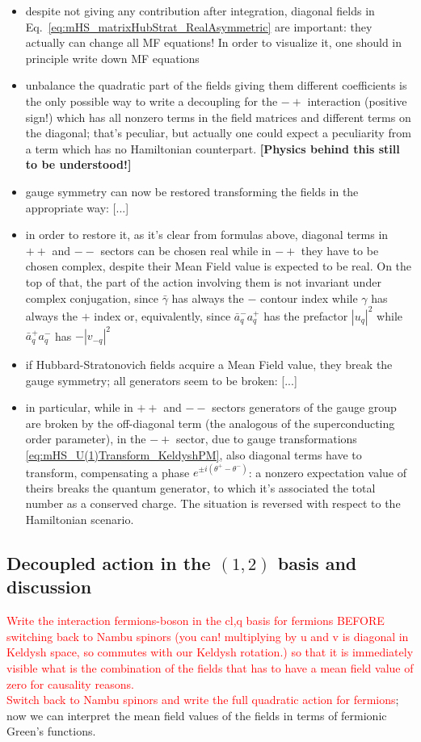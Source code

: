 \documentclass[a4paper,11pt, english]{article}
\newcommand{\ssubsection}[2]{\subsection{\texorpdfstring{#1}{#2}}}
\theoremstyle{remark}
\newcommand{\nsec}{\vskip 0.8cm}
\newcommand{\gammabar}{\bar{\gamma}}
\begin{document}
\begin{itemize}
 \item despite not giving any contribution after integration, diagonal fields in Eq.~\eqref{eq:mHS_matrixHubStrat_RealAsymmetric} are important: they actually can change all MF equations! In order to visualize it, one should in principle write down MF equations
 \item unbalance the quadratic part of the fields giving them different coefficients is the only possible way to write a decoupling for the $-+$ interaction (positive sign!) which has all nonzero terms in the field matrices and different terms on the diagonal; that's peculiar, but actually one could expect a peculiarity from a term which has no Hamiltonian counterpart. \textbf{[Physics behind this still to be understood!]}
 \item gauge symmetry can now be restored transforming the fields in the appropriate way: [...]
 \item in order to restore it, as it's clear from formulas above, diagonal terms in $++$ and $--$ sectors can be chosen real while in $-+$ they have to be chosen complex, despite their Mean Field value is expected to be real. On the top of that, the part of the action involving them is not invariant under complex conjugation, since $\gammabar$ has always the $-$ contour index while $\gamma$ has always the $+$ index or, equivalently, since $\bar a^-_qa^+_q$ has the prefactor $|u_q|^2$ while $\bar a^+_qa^-_q$ has $-|v_{-q}|^2$
 \item if Hubbard-Stratonovich fields acquire a Mean Field value, they break the gauge symmetry; all generators seem to be broken: [...]
 \item in particular, while in $++$ and $--$ sectors generators of the gauge group are broken by the off-diagonal term (the analogous of the superconducting order parameter), in the $-+$ sector, due to gauge transformations \eqref{eq:mHS_U(1)Transform_KeldyshPM}, also diagonal terms have to transform, compensating a phase $e^{\pm i (\theta^+-\theta^-)}$: a nonzero expectation value of theirs breaks the quantum generator, to which it's associated the total number as a conserved charge. The situation is reversed with respect to the Hamiltonian scenario.
\end{itemize}

\nsec

\ssubsection{Decoupled action in the $(1,2)$ basis and discussion}{Decoupled action in the (1,2) basis and discussion}
\textcolor{red}{Write the interaction fermions-boson in the cl,q basis for fermions BEFORE switching back to Nambu spinors (you can! multiplying by u and v is diagonal in Keldysh space, so commutes with our Keldysh rotation.) so that it is immediately visible what is the combination of the fields that has to have a mean field value of zero for causality reasons.\\
Switch back to Nambu spinors and write the full quadratic action for fermions}; now we can interpret the mean field values of the fields in terms of fermionic Green's functions.

{}
  
\end{document}
